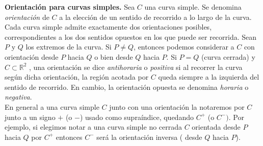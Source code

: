\begin{center}
\end{center}



\begin{definition}\label{orien}  \textbf{Orientaci\'on para curvas simples.}   Sea $C$  una curva simple. Se denomina \emph{orientación} de $C$ a la elección de un sentido de recorrido a lo largo de la curva. Cada curva simple admite exactamente dos orientaciones posibles, correspondientes a los dos sentidos opuestos en los que puede ser recorrida.  Sean  $P$ y $Q$  los extremos de la curva. Si  $P\neq Q$,  entonces podemos considerar a $C$ con orientaci\'on desde $P$ hacia $Q$ o bien desde $Q$ hacia $P$.   Si  $P= Q$  (curva cerrada) y  $C \subset \mathbb{R}^{2}$ 
, una orientación se dice  \emph{antihoraria} o \emph{positiva} si  al recorrer la curva según dicha orientación, la región acotada por $C$  queda siempre a la izquierda del sentido de recorrido. En cambio, la orientación opuesta  se denomina \emph{horaria} o \emph{negativa}.  \\ En general a una curva simple $C$ junto con una orientaci\'on la notaremos por $C$ junto a un signo $+$ (o $-$) usado como  supra\'indice, quedando $C^{+}$  (o $C^{-}).$  Por ejemplo, si elegimos notar a una curva simple no cerrada $C$ orientada desde $P$ hacia $Q$  por  $C^{+}$  entonces  $C^{-}$ ser\'a la orientaci\'on inversa ( desde $Q$ hacia $P$).
\end{definition}


